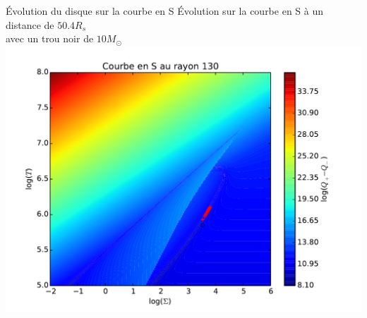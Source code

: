 \documentclass{beamer}
\begin{document}
\begin{frame}{Évolution du disque sur la courbe en S}
 \centering
 Évolution sur la courbe en S à un distance de $50.4 R_s$ \\avec un trou noir de $10 M_{\odot}$
 \includegraphics[width=0.8\linewidth]{SLog-130}
\end{frame}
\end{document}
